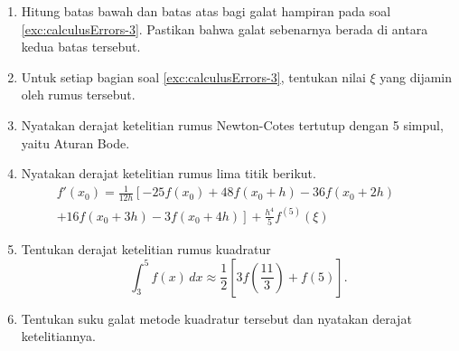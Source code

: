 \begin{small}
\begin{enumerate}
\begin{enumerate}
\item \label{exc:calculusErrors-36}$f(x)=e^{x}$; $x_{0}=2$; $h=0.1$. \hasasolution 
\item \label{exc:calculusErrors-20}$f(x)=(\cosh2x)^{2}-\sin x$; $x_{0}=\pi$;
$h=0.05$. \hasananswer 
\item $f(x)=\ln(2x-3)+5x$; $x=10$; $h=1$.
\end{enumerate}
\item \label{exc:calculusErrors-8}Hitung batas bawah dan batas atas bagi
galat hampiran pada soal \ref{exc:calculusErrors-3}. Pastikan bahwa
galat sebenarnya berada di antara kedua batas tersebut. \haspartwithsolution  \haspartwithanswer 
\item \label{exc:calculusErrors-9}Untuk setiap bagian soal \ref{exc:calculusErrors-3},
tentukan nilai $\xi$ yang dijamin oleh rumus tersebut. \haspartwithsolution  \haspartwithanswer 
\item Nyatakan derajat ketelitian rumus Newton-Cotes tertutup dengan 5 simpul,
yaitu Aturan Bode.
\item \label{exc:calculusErrors-10}Nyatakan derajat ketelitian rumus lima
titik berikut. \hasasolution 
\begin{align*}
f'(x_{0})=\frac{1}{12h}\left[-25f(x_{0})+48f(x_{0}+h)-36f(x_{0}+2h)\right.\qquad\\
\left.+16f(x_{0}+3h)-3f(x_{0}+4h)\right]+\frac{h^{4}}{5}f^{(5)}(\xi)
\end{align*}
\item Tentukan derajat ketelitian rumus kuadratur
\[
\int_{3}^{5}f(x)\,dx\approx\frac{1}{2}\left[3f\left(\frac{11}{3}\right)+f(5)\right].
\]
\item Tentukan suku galat metode kuadratur tersebut dan nyatakan derajat
ketelitiannya.


\end{enumerate}
\end{small}
